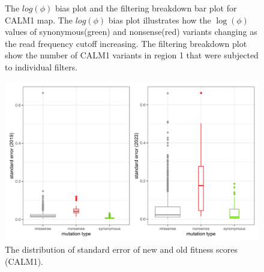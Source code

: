 \documentclass{article}
\begin{document}
\begin{figure}[H]%
    \centering
    \qquad
    \caption{The $log(\phi)$ bias plot and the filtering breakdown bar plot for CALM1 map. The $log(\phi)$ bias plot illustrates how the $\log(\phi)$ values of synonymous(green) and nonsense(red) variants changing as the read frequency cutoff increasing. The filtering breakdown plot show the number of CALM1 variants in region 1 that were subjected to individual filters.}%
    \label{fig:filtering_CALM1}%
\end{figure}


\begin{figure}[H]
    \centering
    \includegraphics[width =.8\textwidth]{Figures/CALM1/se_boxplot.png}
    \caption{The distribution of standard error of new and old fitness scores (CALM1).}
    \label{fig:se boxplot CALM1}
\end{figure}
\end{document}
